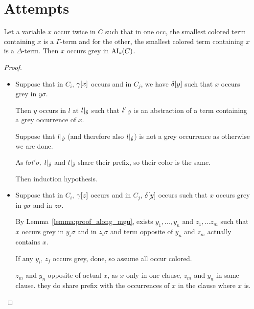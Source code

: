 \documentclass[,%
	paper=a4,%
	DIV11, %
	twoside=false,%
	liststotoc,
	bibtotoc,
	draft=false,%
	numbers=noendperiod
]{scrartcl}
\begin{document}

\clearpage

\section{Attempts}

\begin{clemma}
	\label{lemma:smallest_colored_container}
	Let a variable $x$ occur twice in $C$ such that in one occ, the smallest colored term containing $x$ is a $\Gamma$-term and for the other, the smallest colored term containing $x$ is a $\Delta$-term.
	Then $x$ occurs grey in $\operatorname{AI}_\mathrm{*}(C)$.
\end{clemma}
\begin{proof}
	~
	\begin{itemize}
		\item
			Suppose that in $C_i$, $\gamma[x]$ occurs and in $C_j$, we have $\delta[y]$ such that $x$ occurs grey in $y\sigma$.

			Then $y$ occurs in $l$ at $l|_{\bm\hat y}$ such that $l'|_{\bm\hat y}$ is an abstraction of a term containing a grey occurrence of $x$.

			Suppose that $l|_{\bm\hat y}$ (and therefore also $l|_{\bm\hat y}$) is not a grey occurrence as otherwise we are done. 

			As $l\sigma l'\sigma $, $l|_{\bm\hat y}$ and $l|_{\bm\hat y}$ share their prefix, so their color is the same.

			Then induction hypothesis.

		\item 
			Suppose that in $C_i$, $\gamma[z]$ occurs and in $C_j$, $\delta[y]$ occurs such that $x$ occurs grey in $y\sigma$ and in $z\sigma$.

			By Lemma~\ref{lemma:proof_along_mgu}, exists $y_1, \dots, y_n$ and $z_1, \dots z_m$ such that $x$ occurs grey in $y_i\sigma$ and in $z_i\sigma$ and term opposite of $y_n$ and $z_m$ actually contains $x$.


			If any $y_i$, $z_j$ occurs grey, done, so assume all occur colored.

			$z_m$ and $y_n$ opposite of actual $x$, as $x$ only in one clause, $z_m$ and $y_n$ in same clause. 
			they do share prefix with the occurrences of $x$ in the clause where $x$ is.


\end{itemize}
\end{proof}
\end{document}
